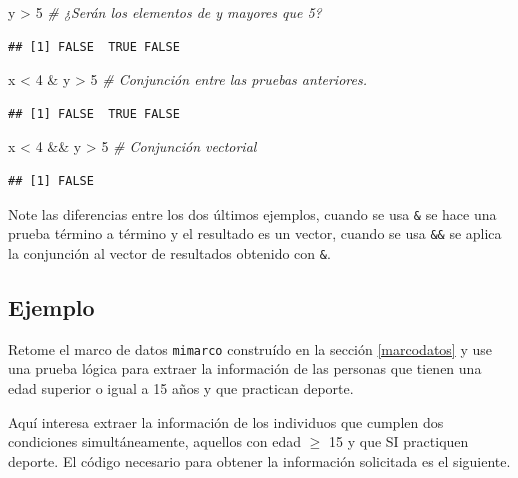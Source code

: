 \documentclass[10pt,]{krantz}
\makeatletter
\newenvironment{Shaded}{\begin{snugshade}}{\end{snugshade}}
\newcommand{\DecValTok}[1]{\textcolor[rgb]{0.00,0.00,0.81}{{#1}}}
\newcommand{\StringTok}[1]{\textcolor[rgb]{0.31,0.60,0.02}{{#1}}}
\newcommand{\CommentTok}[1]{\textcolor[rgb]{0.56,0.35,0.01}{\textit{{#1}}}}
\newcommand{\NormalTok}[1]{{#1}}
\newenvironment{kframe}{%
\medskip{}
\setlength{\fboxsep}{.8em}
 \def\at@end@of@kframe{}%
 \ifinner\ifhmode%
  \def\at@end@of@kframe{\end{minipage}}%
  \begin{minipage}{\columnwidth}%
 \fi\fi%
 \def\FrameCommand##1{\hskip\@totalleftmargin \hskip-\fboxsep
 \colorbox{shadecolor}{##1}\hskip-\fboxsep
     \hskip-\linewidth \hskip-\@totalleftmargin \hskip\columnwidth}%
 \MakeFramed {\advance\hsize-\width
   \@totalleftmargin\z@ \linewidth\hsize
   \@setminipage}}%
 {\par\unskip\endMakeFramed%
 \at@end@of@kframe}
\renewenvironment{Shaded}{\begin{kframe}}{\end{kframe}}
\makeatother
\begin{document}
\begin{Shaded}
\begin{Highlighting}[]
\NormalTok{y >}\StringTok{ }\DecValTok{5}  \CommentTok{# ¿Serán los elementos de y mayores que 5?}
\end{Highlighting}
\end{Shaded}

\begin{verbatim}
## [1] FALSE  TRUE FALSE
\end{verbatim}

\begin{Shaded}
\begin{Highlighting}[]
\NormalTok{x <}\StringTok{ }\DecValTok{4} \NormalTok{&}\StringTok{ }\NormalTok{y >}\StringTok{ }\DecValTok{5}  \CommentTok{# Conjunción entre las pruebas anteriores.}
\end{Highlighting}
\end{Shaded}

\begin{verbatim}
## [1] FALSE  TRUE FALSE
\end{verbatim}

\begin{Shaded}
\begin{Highlighting}[]
\NormalTok{x <}\StringTok{ }\DecValTok{4} \NormalTok{&&}\StringTok{ }\NormalTok{y >}\StringTok{ }\DecValTok{5}  \CommentTok{# Conjunción vectorial}
\end{Highlighting}
\end{Shaded}

\begin{verbatim}
## [1] FALSE
\end{verbatim}

Note las diferencias entre los dos últimos ejemplos, cuando se usa
\texttt{\&} se hace una prueba término a término y el resultado es un
vector, cuando se usa \texttt{\&\&} se aplica la conjunción al vector de
resultados obtenido con \texttt{\&}.

\subsection*{Ejemplo}\label{ejemplo-8}


Retome el marco de datos \texttt{mimarco} construído en la sección
\ref{marcodatos} y use una prueba lógica para extraer la información de
las personas que tienen una edad superior o igual a 15 años y que
practican deporte.

Aquí interesa extraer la información de los individuos que cumplen dos
condiciones simultáneamente, aquellos con edad \(\geq\) 15 y que SI
practiquen deporte. El código necesario para obtener la información
solicitada es el siguiente.
\end{document}
